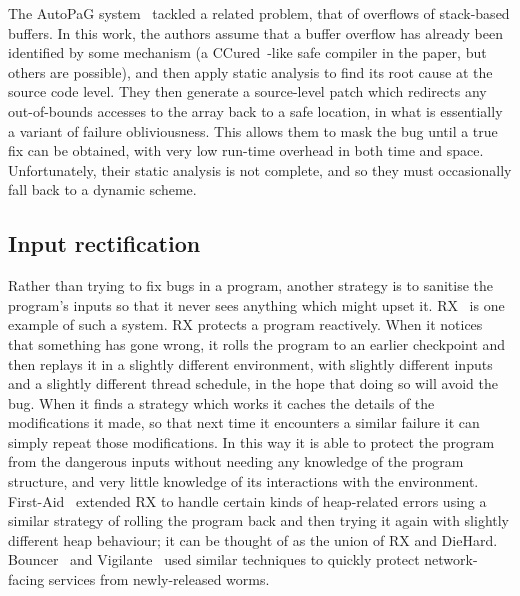 The AutoPaG system~\cite{Lin2007} tackled a related problem, that of
overflows of stack-based buffers.  In this work, the authors assume
that a buffer overflow has already been identified by some mechanism
(a CCured~\cite{Necula2005}-like safe compiler in the paper, but others
are possible), and then apply static analysis to find its root cause
at the source code level.  They then generate a source-level patch
which redirects any out-of-bounds accesses to the array back to a safe
location, in what is essentially a variant of failure obliviousness.
This allows them to mask the bug until a true fix can be obtained,
with very low run-time overhead in both time and space.
Unfortunately, their static analysis is not complete, and so they
must occasionally fall back to a dynamic scheme.

\subsection{Input rectification}

Rather than trying to fix bugs in a program, another strategy is to
sanitise the program's inputs so that it never sees anything which
might upset it.  RX~\cite{Qin2007} is one example of such a system.  RX
protects a program reactively.  When it notices that something has
gone wrong, it rolls the program to an earlier checkpoint and then
replays it in a slightly different environment, with slightly
different inputs and a slightly different thread schedule, in the hope
that doing so will avoid the bug.  When it finds a strategy which
works it caches the details of the modifications it made, so that next
time it encounters a similar failure it can simply repeat those
modifications.  In this way it is able to protect the program from the
dangerous inputs without needing any knowledge of the program
structure, and very little knowledge of its interactions with the
environment.  First-Aid~\cite{Gao2009} extended RX to handle certain
kinds of heap-related errors using a similar strategy of rolling the
program back and then trying it again with slightly different heap
behaviour; it can be thought of as the union of RX and DieHard.
Bouncer~\cite{Costa2007} and Vigilante~\cite{Costa2008} used similar
techniques to quickly protect network-facing services from
newly-released worms.


